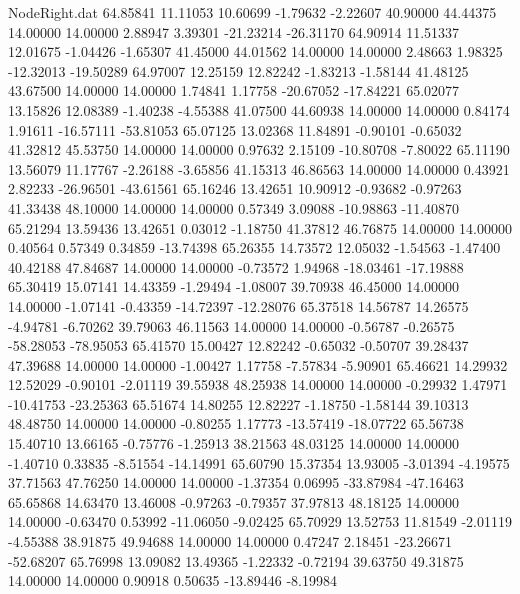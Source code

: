 \begin{filecontents}{NodeRight.dat}
  64.85841   11.11053   10.60699    -1.79632   -2.22607   40.90000   44.44375   14.00000   14.00000    2.88947    3.39301  -21.23214  -26.31170
  64.90914   11.51337   12.01675    -1.04426   -1.65307   41.45000   44.01562   14.00000   14.00000    2.48663    1.98325  -12.32013  -19.50289
  64.97007   12.25159   12.82242    -1.83213   -1.58144   41.48125   43.67500   14.00000   14.00000    1.74841    1.17758  -20.67052  -17.84221
  65.02077   13.15826   12.08389    -1.40238   -4.55388   41.07500   44.60938   14.00000   14.00000    0.84174    1.91611  -16.57111  -53.81053
  65.07125   13.02368   11.84891    -0.90101   -0.65032   41.32812   45.53750   14.00000   14.00000    0.97632    2.15109  -10.80708   -7.80022
  65.11190   13.56079   11.17767    -2.26188   -3.65856   41.15313   46.86563   14.00000   14.00000    0.43921    2.82233  -26.96501  -43.61561
  65.16246   13.42651   10.90912    -0.93682   -0.97263   41.33438   48.10000   14.00000   14.00000    0.57349    3.09088  -10.98863  -11.40870
  65.21294   13.59436   13.42651     0.03012   -1.18750   41.37812   46.76875   14.00000   14.00000    0.40564    0.57349    0.34859  -13.74398
  65.26355   14.73572   12.05032    -1.54563   -1.47400   40.42188   47.84687   14.00000   14.00000   -0.73572    1.94968  -18.03461  -17.19888
  65.30419   15.07141   14.43359    -1.29494   -1.08007   39.70938   46.45000   14.00000   14.00000   -1.07141   -0.43359  -14.72397  -12.28076
  65.37518   14.56787   14.26575    -4.94781   -6.70262   39.79063   46.11563   14.00000   14.00000   -0.56787   -0.26575  -58.28053  -78.95053
  65.41570   15.00427   12.82242    -0.65032   -0.50707   39.28437   47.39688   14.00000   14.00000   -1.00427    1.17758   -7.57834   -5.90901
  65.46621   14.29932   12.52029    -0.90101   -2.01119   39.55938   48.25938   14.00000   14.00000   -0.29932    1.47971  -10.41753  -23.25363
  65.51674   14.80255   12.82227    -1.18750   -1.58144   39.10313   48.48750   14.00000   14.00000   -0.80255    1.17773  -13.57419  -18.07722
  65.56738   15.40710   13.66165    -0.75776   -1.25913   38.21563   48.03125   14.00000   14.00000   -1.40710    0.33835   -8.51554  -14.14991
  65.60790   15.37354   13.93005    -3.01394   -4.19575   37.71563   47.76250   14.00000   14.00000   -1.37354    0.06995  -33.87984  -47.16463
  65.65868   14.63470   13.46008    -0.97263   -0.79357   37.97813   48.18125   14.00000   14.00000   -0.63470    0.53992  -11.06050   -9.02425
  65.70929   13.52753   11.81549    -2.01119   -4.55388   38.91875   49.94688   14.00000   14.00000    0.47247    2.18451  -23.26671  -52.68207
  65.76998   13.09082   13.49365    -1.22332   -0.72194   39.63750   49.31875   14.00000   14.00000    0.90918    0.50635  -13.89446   -8.19984

\end{filecontents}
